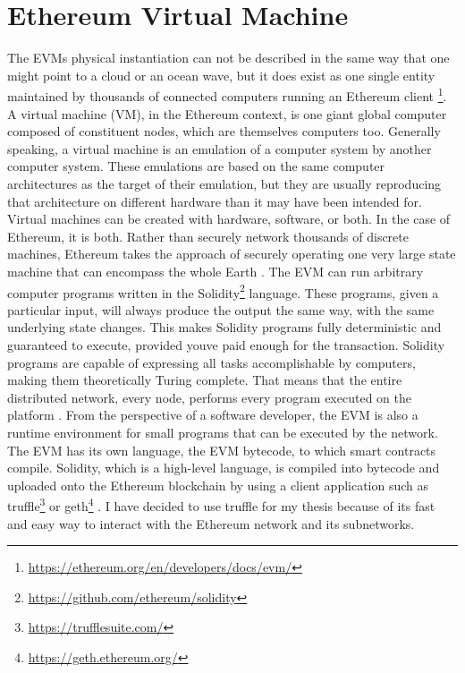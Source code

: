 \section{Ethereum Virtual Machine}
\label{sec:evm}
The EVMs physical instantiation can not be described in the same way that one might point to a cloud or an ocean wave, but it does exist as one single entity maintained by thousands of connected computers running an Ethereum client \footnote{\url{https://ethereum.org/en/developers/docs/evm/}}.
A virtual machine (VM), in the Ethereum context, is one giant global computer composed of constituent nodes, which are themselves computers too. Generally speaking, a virtual machine is an emulation of a computer system by another computer system. These emulations are based on the same computer architectures as the target of their emulation, but they are usually reproducing that architecture on different hardware than it may have been intended for. Virtual machines can be created with hardware, software, or both. In the case of Ethereum, it is both. Rather than securely network thousands of discrete machines, Ethereum takes the approach of securely operating one very large state machine that can encompass the whole Earth \cite[48]{dannen2017introducing}.
The EVM can run arbitrary computer programs written in the Solidity\footnote{\url{https://github.com/ethereum/solidity}} language. These programs, given a particular input, will always produce the output the same way, with the same underlying state changes. This makes Solidity programs fully deterministic and guaranteed to execute, provided youve paid enough for the transaction. Solidity programs are capable of expressing all tasks accomplishable by computers, making them theoretically Turing complete. That means that the entire distributed network, every node, performs every program executed on the platform \cite[50]{dannen2017introducing}. 
From the perspective of a software developer, the EVM is also a runtime environment for small programs that can be executed by the network. The EVM has its own language, the EVM bytecode, to which smart contracts compile. Solidity, which is a high-level language, is compiled into bytecode and uploaded onto the Ethereum blockchain by using a client application such as truffle\footnote{\url{https://trufflesuite.com/}} or geth\footnote{\url{https://geth.ethereum.org/}} \cite[51]{dannen2017introducing}. 
I have decided to use truffle for my thesis because of its fast and easy way to interact with the Ethereum network and its subnetworks.
